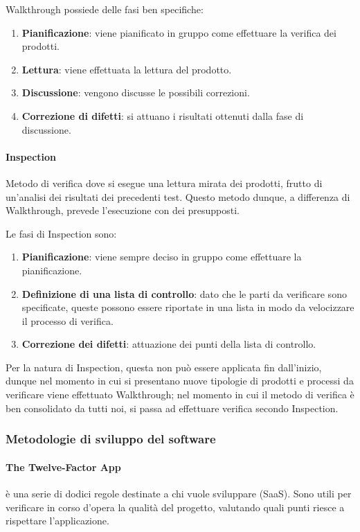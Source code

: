 			Walkthrough possiede delle fasi ben specifiche:

			\begin{enumerate}
				\item \textbf{Pianificazione}: viene pianificato in gruppo come effettuare la verifica dei prodotti.
				\item \textbf{Lettura}: viene effettuata la lettura del prodotto.
				\item \textbf{Discussione}: vengono discusse le possibili correzioni.
				\item \textbf{Correzione di difetti}: si attuano i risultati ottenuti dalla fase di discussione.
			\end{enumerate}

			\paragraph{Inspection}
			Metodo di verifica dove si esegue una lettura mirata dei prodotti, frutto di un'analisi dei risultati dei precedenti test.
			Questo metodo dunque, a differenza di Walkthrough, prevede l'esecuzione con dei presupposti.

			Le fasi di Inspection sono:

			\begin{enumerate}
				\item \textbf{Pianificazione}: viene sempre deciso in gruppo come effettuare la pianificazione.
				\item \textbf{Definizione di una lista di controllo}: dato che le parti da verificare sono specificate, queste possono essere
				riportate in una lista in modo da velocizzare il processo di verifica.
				\item \textbf{Correzione dei difetti}: attuazione dei punti della lista di controllo.
			\end{enumerate}

			Per la natura di Inspection, questa non può essere applicata fin dall'inizio, dunque nel momento in cui si presentano nuove tipologie di
			prodotti e processi da verificare viene effettuato Walkthrough; nel momento in cui il metodo di verifica è ben consolidato da tutti noi,
			si passa ad effettuare verifica secondo Inspection.

		\subsubsection{Metodologie di sviluppo del software}

		\paragraph{The Twelve-Factor App}
		 è una serie di dodici regole destinate a chi vuole sviluppare  (SaaS). Sono utili per verificare in corso d'opera la qualità del progetto, valutando quali punti riesce a rispettare l'applicazione.

